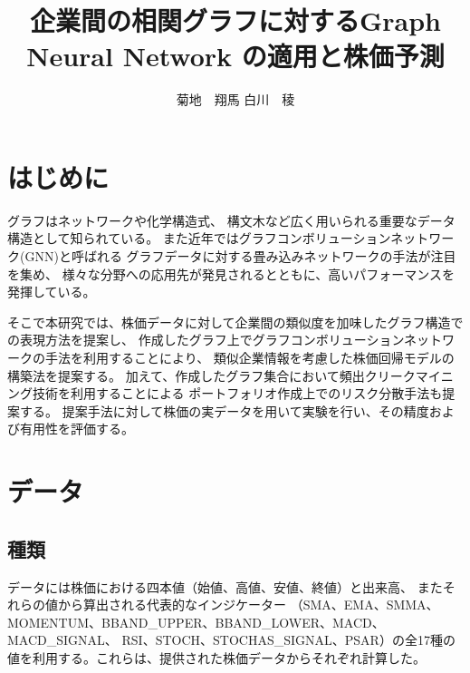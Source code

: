 \documentclass[twocolumn,10.5pt]{article}           %
\begin{document}
\title{企業間の相関グラフに対するGraph Neural Network の適用と株価予測}
\author{菊地　翔馬 \hspace{180pt} 白川　稜}

\date{}
\maketitle


\section{はじめに}
グラフはネットワークや化学構造式、
構文木など広く用いられる重要なデータ構造として知られている。
また近年ではグラフコンボリューションネットワーク(GNN)と呼ばれる
グラフデータに対する畳み込みネットワークの手法が注目を集め、
様々な分野への応用先が発見されるとともに、高いパフォーマンスを発揮している。

そこで本研究では、株価データに対して企業間の類似度を加味したグラフ構造での表現方法を提案し、
作成したグラフ上でグラフコンボリューションネットワークの手法を利用することにより、
類似企業情報を考慮した株価回帰モデルの構築法を提案する。
加えて、作成したグラフ集合において頻出クリークマイニング技術を利用することによる
ポートフォリオ作成上でのリスク分散手法も提案する。
提案手法に対して株価の実データを用いて実験を行い、その精度および有用性を評価する。

\section{データ}
\subsection{種類}
データには株価における四本値（始値、高値、安値、終値）と出来高、
またそれらの値から算出される代表的なインジケーター
（SMA、EMA、SMMA、MOMENTUM、BBAND\_UPPER、BBAND\_LOWER、MACD、MACD\_SIGNAL、
RSI、STOCH、STOCHAS\_SIGNAL、PSAR）の全17種の値を利用する。これらは、提供された株価データからそれぞれ計算した。
\end{document}
